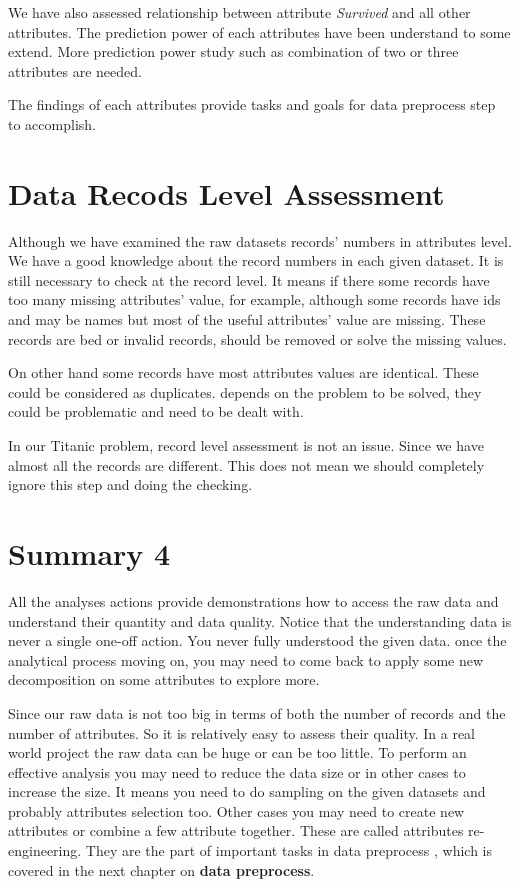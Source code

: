 \documentclass[
]{book}
\begin{document}
We have also assessed relationship between attribute \emph{Survived} and all other attributes. The prediction power of each attributes have been understand to some extend. More prediction power study such as combination of two or three attributes are needed.

The findings of each attributes provide tasks and goals for data preprocess step to accomplish.

\hypertarget{data-recods-level-assessment}{%
\section{Data Recods Level Assessment}\label{data-recods-level-assessment}}

Although we have examined the raw datasets records' numbers in attributes level. We have a good knowledge about the record numbers in each given dataset. It is still necessary to check at the record level. It means if there some records have too many missing attributes' value, for example, although some records have ids and may be names but most of the useful attributes' value are missing. These records are bed or invalid records, should be removed or solve the missing values.

On other hand some records have most attributes values are identical. These could be considered as duplicates. depends on the problem to be solved, they could be problematic and need to be dealt with.

In our Titanic problem, record level assessment is not an issue. Since we have almost all the records are different. This does not mean we should completely ignore this step and doing the checking.

\hypertarget{summary-4}{%
\section*{Summary 4}\label{summary-4}}


All the analyses actions provide demonstrations how to access the raw data and understand their quantity and data quality. Notice that the understanding data is never a single one-off action. You never fully understood the given data. once the analytical process moving on, you may need to come back to apply some new decomposition on some attributes to explore more.

Since our raw data is not too big in terms of both the number of records and the number of attributes. So it is relatively easy to assess their quality. In a real world project the raw data can be huge or can be too little. To perform an effective analysis you may need to reduce the data size or in other cases to increase the size. It means you need to do sampling on the given datasets and probably attributes selection too. Other cases you may need to create new attributes or combine a few attribute together. These are called attributes re-engineering. They are the part of important tasks in data preprocess , which is covered in the next chapter on \textbf{data preprocess}.
\end{document}
